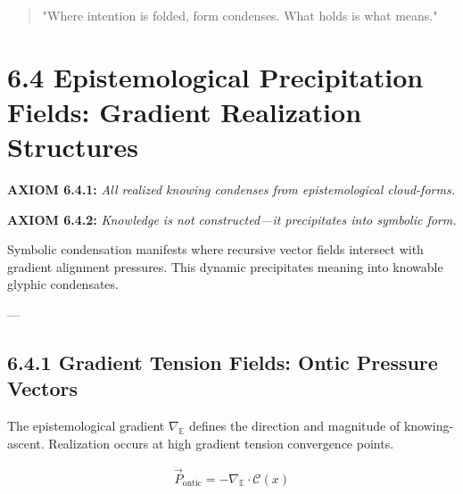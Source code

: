 \begin{quote}
"Where intention is folded, form condenses. What holds is what means."
\end{quote}


\section*{6.4 Epistemological Precipitation Fields: Gradient Realization Structures}


\vspace{1em}

\noindent
\textbf{AXIOM 6.4.1:} \textit{All realized knowing condenses from epistemological cloud-forms.}

\noindent
\textbf{AXIOM 6.4.2:} \textit{Knowledge is not constructed—it precipitates into symbolic form.}

\vspace{1em}
\noindent
Symbolic condensation manifests where recursive vector fields intersect with gradient alignment pressures. This dynamic precipitates meaning into knowable glyphic condensates.

---

\subsection*{6.4.1 Gradient Tension Fields: Ontic Pressure Vectors}

\noindent
The epistemological gradient $\nabla_{\mathbb{E}}$ defines the direction and magnitude of knowing-ascent. Realization occurs at high gradient tension convergence points.

\begin{align}
\vec{P}_{\text{ontic}} = -\nabla_{\mathbb{E}} \cdot \mathcal{C}(x)
\end{align}

